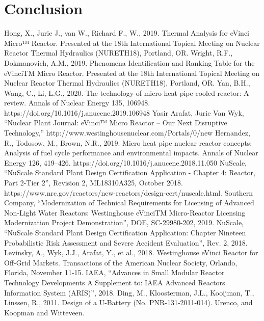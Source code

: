 \documentclass[10pt,a4paper]{article}
\begin{document}
\section{Conclusion}

\pagebreak
\begin{thebibliography}{X}
 Hong, X., Jurie J.,  van W., Richard F., W., 2019. Thermal Analysis for eVinci Micro™ Reactor. Presented at the 18th International Topical Meeting on Nuclear Reactor Thermal Hydraulics (NURETH18), Portland, OR.
 Wright, R.F., Dokmanovich, A.M., 2019. Phenomena Identification and Ranking Table for the eVinciTM Micro Reactor. Presented at the 18th International Topical Meeting on Nuclear Reactor Thermal Hydraulics (NURETH18), Portland, OR.
 Yan, B.H., Wang, C., Li, L.G., 2020. The technology of micro heat pipe cooled reactor: A review. Annals of Nuclear Energy 135, 106948. https://doi.org/10.1016/j.anucene.2019.106948
 Yasir Arafat, Jurie Van Wyk, “Nuclear Plant Journal: eVinci™ Micro Reactor – Our Next Disruptive Technology,” http://www.westinghousenuclear.com/Portals/0/new%
 Hernandez, R., Todosow, M., Brown, N.R., 2019. Micro heat pipe nuclear reactor concepts: Analysis of fuel cycle performance and environmental impacts. Annals of Nuclear Energy 126, 419–426. https://doi.org/10.1016/j.anucene.2018.11.050
 NuScale, “NuScale Standard Plant Design Certification Application - Chapter 4: Reactor, Part 2-Tier 2”, Revision 2, ML18310A325, October 2018. https://www.nrc.gov/reactors/new-reactors/design-cert/nuscale.html. 
 Southern Company, “Modernization of Technical Requirements for Licensing of Advanced Non-Light Water Reactors: Westinghouse eVinciTM Micro-Reactor Licensing Modernization Project Demonstration”, DOE, SC-29980-202, 2019.
 NuScale, “NuScale Standard Plant Design Certification Application: Chapter Nineteen Probabilistic Risk Assessment and Severe Accident Evaluation”, Rev. 2, 2018. 
 Levinsky, A., Wyk, J.J., Arafat, Y., et al., 2018. Westinghouse eVinci Reactor for Off-Grid Markets. Transactions of the American Nuclear Society, Orlando, Florida, November 11-15.
 IAEA, “Advances in Small Modular Reactor Technology Developments A Supplement to: IAEA Advanced Reactors Information System (ARIS)”, 2018. 
Ding, M., Kloosterman, J.L., Kooijman, T., Linssen, R., 2011. Design of a U-Battery (No. PNR-131-2011-014). Urenco, and Koopman and Witteveen.

\end{thebibliography}
\end{document}
